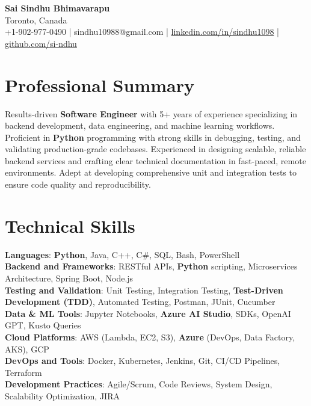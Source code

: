 \documentclass[letterpaper,11pt]{article}
\begin{document}
\begin{center}
  {\Large \textbf{Sai Sindhu Bhimavarapu}} \\
  Toronto, Canada \\
  +1-902-977-0490 \enspace | \enspace sindhu10988@gmail.com \enspace | \enspace \href{https://www.linkedin.com/in/sindhu1098/}{linkedin.com/in/sindhu1098} \enspace | \enspace \href{https://github.com/si-ndhu}{github.com/si-ndhu}
\end{center}

\section{Professional Summary}
  \begin{itemize}[leftmargin=0.15in, label={}]
    \small{\item{
     Results-driven \textbf{Software Engineer} with 5+ years of experience specializing in backend development, data engineering, and machine learning workflows. Proficient in \textbf{Python} programming with strong skills in debugging, testing, and validating production-grade codebases. Experienced in designing scalable, reliable backend services and crafting clear technical documentation in fast-paced, remote environments. Adept at developing comprehensive unit and integration tests to ensure code quality and reproducibility.
    }}
  \end{itemize}
\vspace{-16pt}

\section{Technical Skills}
 \begin{itemize}[leftmargin=0.15in, label={}]
    \small{\item{
     \textbf{Languages}: \textbf{Python}, Java, C++, C\#, SQL, Bash, PowerShell \\
     \textbf{Backend and Frameworks}: RESTful APIs, \textbf{Python} scripting, Microservices Architecture, Spring Boot, Node.js \\
     \textbf{Testing and Validation}: Unit Testing, Integration Testing, \textbf{Test-Driven Development (TDD)}, Automated Testing, Postman, JUnit, Cucumber \\
     \textbf{Data & ML Tools}: Jupyter Notebooks, \textbf{Azure AI Studio}, SDKs, OpenAI GPT, Kusto Queries \\
     \textbf{Cloud Platforms}: AWS (Lambda, EC2, S3), \textbf{Azure} (DevOps, Data Factory, AKS), GCP \\
     \textbf{DevOps and Tools}: Docker, Kubernetes, Jenkins, Git, CI/CD Pipelines, Terraform \\
     \textbf{Development Practices}: Agile/Scrum, Code Reviews, System Design, Scalability Optimization, JIRA
    }}
 \end{itemize}
\vspace{-16pt}
\end{document}
